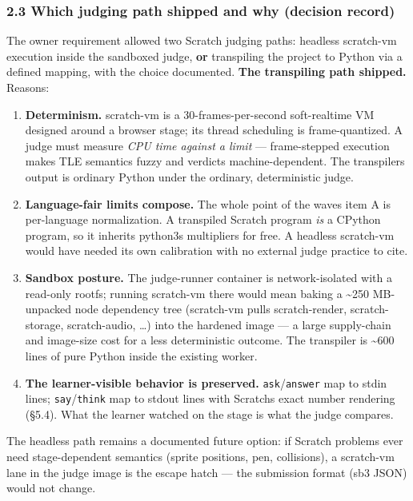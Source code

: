 \documentclass[
]{article}
\providecommand{\tightlist}{%
  \setlength{\itemsep}{0pt}\setlength{\parskip}{0pt}}
\begin{document}
\subsubsection{2.3 Which judging path shipped and why (decision
record)}\label{23-which-judging-path-shipped-and-why-decision-record}

The owner requirement allowed two Scratch judging paths: headless
scratch-vm execution inside the sandboxed judge, \textbf{or} transpiling
the project to Python via a defined mapping, with the choice documented.
\textbf{The transpiling path shipped.} Reasons:

\begin{enumerate}
\def\labelenumi{\arabic{enumi}.}
\tightlist
\item
  \textbf{Determinism.} scratch-vm is a 30-frames-per-second
  soft-realtime VM designed around a browser stage; its thread
  scheduling is frame-quantized. A judge must measure \emph{CPU time
  against a limit} --- frame-stepped execution makes TLE semantics fuzzy
  and verdicts machine-dependent. The transpiler\textquotesingle s
  output is ordinary Python under the ordinary, deterministic judge.
\item
  \textbf{Language-fair limits compose.} The whole point of the
  wave\textquotesingle s item A is per-language normalization. A
  transpiled Scratch program \emph{is} a CPython program, so it inherits
  python3\textquotesingle s multipliers for free. A headless scratch-vm
  would have needed its own calibration with no external judge practice
  to cite.
\item
  \textbf{Sandbox posture.} The judge-runner container is
  network-isolated with a read-only rootfs; running scratch-vm there
  would mean baking a \textasciitilde250 MB-unpacked node dependency
  tree (scratch-vm pulls scratch-render, scratch-storage, scratch-audio,
  \ldots) into the hardened image --- a large supply-chain and
  image-size cost for a less deterministic outcome. The transpiler is
  \textasciitilde600 lines of pure Python inside the existing worker.
\item
  \textbf{The learner-visible behavior is preserved.}
  \texttt{ask}/\texttt{answer} map to stdin lines;
  \texttt{say}/\texttt{think} map to stdout lines with
  Scratch\textquotesingle s exact number rendering (§5.4). What the
  learner watched on the stage is what the judge compares.
\end{enumerate}

The headless path remains a documented future option: if Scratch
problems ever need stage-dependent semantics (sprite positions, pen,
collisions), a scratch-vm lane in the judge image is the escape hatch
--- the submission format (sb3 JSON) would not change.
\end{document}
